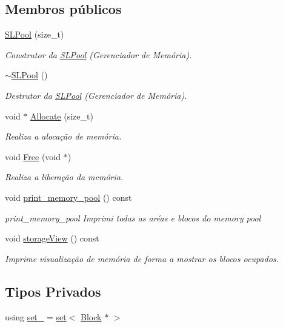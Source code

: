 \subsection*{Membros públicos}
\begin{DoxyCompactItemize}
\item 
\hyperlink{classSLPool_a9e445324d44fff6652cbb70fbd03a5f8}{S\+L\+Pool} (size\+\_\+t)
\begin{DoxyCompactList}\small\item\em Construtor da \hyperlink{classSLPool}{S\+L\+Pool} (Gerenciador de Memória). \end{DoxyCompactList}\item 
\hyperlink{classSLPool_aec8dd0c2fe10addb1786447f8ed62c20}{$\sim$\+S\+L\+Pool} ()
\begin{DoxyCompactList}\small\item\em Destrutor da \hyperlink{classSLPool}{S\+L\+Pool} (Gerenciador de Memória). \end{DoxyCompactList}\item 
void $\ast$ \hyperlink{classSLPool_aaf054ceb8fa1b8e659f656f04a07dc84}{Allocate} (size\+\_\+t)
\begin{DoxyCompactList}\small\item\em Realiza a alocação de memória. \end{DoxyCompactList}\item 
void \hyperlink{classSLPool_aed31c75c4a2d56acd2f845dda2c5b1ad}{Free} (void $\ast$)
\begin{DoxyCompactList}\small\item\em Realiza a liberação da memória. \end{DoxyCompactList}\item 
void \hyperlink{classSLPool_a74c29c43b2e158ce4b50bd908e8b5fed}{print\+\_\+memory\+\_\+pool} () const
\begin{DoxyCompactList}\small\item\em print\+\_\+memory\+\_\+pool Imprimi todas as aréas e blocos do memory pool \end{DoxyCompactList}\item 
void \hyperlink{classSLPool_a568540fc5f7e849c94ae430106d9d285}{storage\+View} () const
\begin{DoxyCompactList}\small\item\em Imprime visualização de memória de forma a mostrar os blocos ocupados. \end{DoxyCompactList}\end{DoxyCompactItemize}
\subsection*{Tipos Privados}
\begin{DoxyCompactItemize}
\item 
using \hyperlink{classSLPool_a56a9012819984d5c7dcdd768482a5d37}{set\+\_\+} = \hyperlink{classset}{set}$<$ \hyperlink{structSLPool_1_1Block}{Block} $\ast$ $>$
\end{DoxyCompactItemize}
